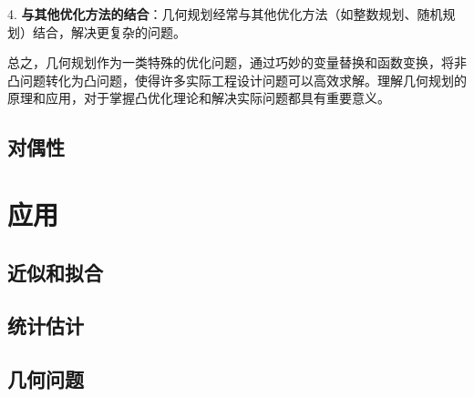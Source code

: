 \documentclass[12pt,a4paper]{book}
\begin{document}
4. \textbf{与其他优化方法的结合}：几何规划经常与其他优化方法（如整数规划、随机规划）结合，解决更复杂的问题。

总之，几何规划作为一类特殊的优化问题，通过巧妙的变量替换和函数变换，将非凸问题转化为凸问题，使得许多实际工程设计问题可以高效求解。理解几何规划的原理和应用，对于掌握凸优化理论和解决实际问题都具有重要意义。

\chapter{对偶性}

\part{应用}
\chapter{近似和拟合}
\chapter{统计估计}
\chapter{几何问题}




\printindex
\end{document}
